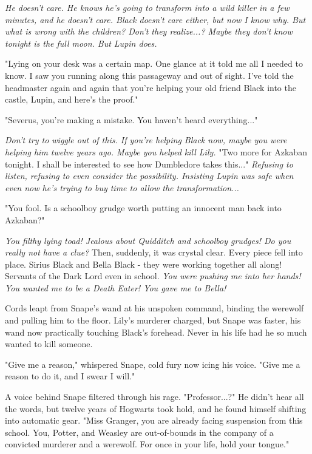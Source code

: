 \documentclass[a4paper,11pt]{article}
\begin{document}
\emph{He doesn't care. He knows he's going to transform into a wild killer in a few minutes, and he doesn't care. Black doesn't care either, but now I know why. But what is wrong with the children? Don't they realize...? Maybe they don't know tonight is the full moon. But Lupin does.}

"Lying on your desk was a certain map. One glance at it told me all I needed to know. I saw you running along this passageway and out of sight. I've told the headmaster again and again that you're helping your old friend Black into the castle, Lupin, and here's the proof."

"Severus, you're making a mistake. You haven't heard everything..."

\emph{Don't try to wiggle out of this. If you're helping Black now, maybe you were helping him twelve years ago. Maybe you helped kill Lily.} "Two more for Azkaban tonight. I shall be interested to see how Dumbledore takes this..." \emph{Refusing to listen, refusing to even consider the possibility. Insisting Lupin was safe when even now he's trying to buy time to allow the transformation...}

"You fool. Is a schoolboy grudge worth putting an innocent man back into Azkaban?"

\emph{You filthy lying toad! Jealous about Quidditch and schoolboy grudges! Do you really not have a clue?} Then, suddenly, it was crystal clear. Every piece fell into place. Sirius Black and Bella Black - they were working together all along! Servants of the Dark Lord even in school. \emph{You were pushing me into her hands! You wanted me to be a Death Eater! You gave me to Bella!}

Cords leapt from Snape's wand at his unspoken command, binding the werewolf and pulling him to the floor. Lily's murderer charged, but Snape was faster, his wand now practically touching Black's forehead. Never in his life had he so much wanted to kill someone.

"Give me a reason," whispered Snape, cold fury now icing his voice. "Give me a reason to do it, and I swear I will."

A voice behind Snape filtered through his rage. "Professor...?" He didn't hear all the words, but twelve years of Hogwarts took hold, and he found himself shifting into automatic gear. "Miss Granger, you are already facing suspension from this school. You, Potter, and Weasley are out-of-bounds in the company of a convicted murderer and a werewolf. For once in your life, hold your tongue."
\end{document}
